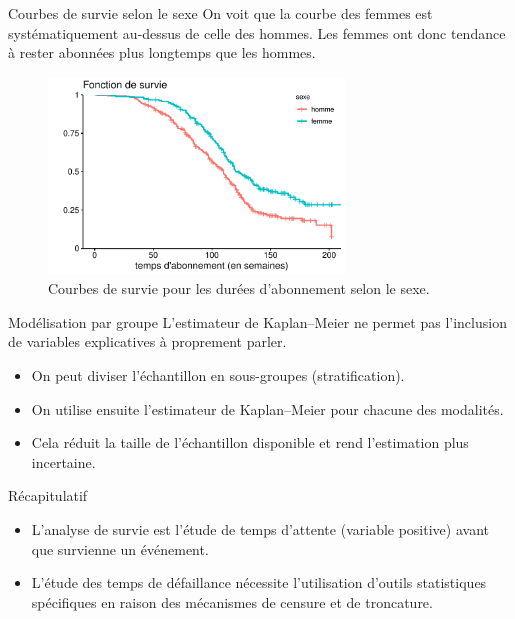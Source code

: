 \documentclass[
  ignorenonframetext,
]{beamer}
\providecommand{\tightlist}{%
  \setlength{\itemsep}{0pt}\setlength{\parskip}{0pt}}\usepackage{longtable,booktabs,array}
\begin{document}
\begin{frame}{Courbes de survie selon le sexe}
\protect\hypertarget{courbes-de-survie-selon-le-sexe}{}
On voit que la courbe des femmes est systématiquement au-dessus de celle
des hommes. Les femmes ont donc tendance à rester abonnées plus
longtemps que les hommes.

\begin{figure}

{\centering \includegraphics[width=0.7\textwidth,height=\textheight]{MATH60602-diapos8_files/figure-beamer/fig-survie-comparaison-courbes-1.pdf}

}

\caption{\label{fig-survie-comparaison-courbes}Courbes de survie pour
les durées d'abonnement selon le sexe.}

\end{figure}
\end{frame}

\begin{frame}{Modélisation par groupe}
\protect\hypertarget{moduxe9lisation-par-groupe}{}
L'estimateur de Kaplan--Meier ne permet pas l'inclusion de variables
explicatives à proprement parler.

\begin{itemize}
\tightlist
\item
  On peut diviser l'échantillon en sous-groupes (stratification).
\item
  On utilise ensuite l'estimateur de Kaplan--Meier pour chacune des
  modalités.
\item
  Cela réduit la taille de l'échantillon disponible et rend l'estimation
  plus incertaine.
\end{itemize}
\end{frame}

\begin{frame}{Récapitulatif}
\protect\hypertarget{ruxe9capitulatif}{}
\begin{itemize}
\tightlist
\item
  L'analyse de survie est l'étude de temps d'attente (variable positive)
  avant que survienne un événement.
\item
  L'étude des temps de défaillance nécessite l'utilisation d'outils
  statistiques spécifiques en raison des mécanismes de censure et de
  troncature.
\end{itemize}
\end{frame}
\end{document}
